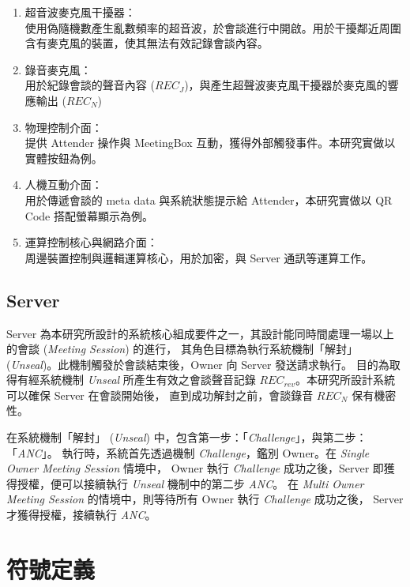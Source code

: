     \begin{enumerate}
        \item 超音波麥克風干擾器：\\
            使用偽隨機數產生亂數頻率的超音波，於會談進行中開啟。用於干擾鄰近周圍含有麥克風的裝置，使其無法有效記錄會談內容。

        \item 錄音麥克風：\\
            用於紀錄會談的聲音內容 ($REC_{J}$)，與產生超聲波麥克風干擾器於麥克風的響應輸出 ($REC_{N}$)

        \item 物理控制介面：\\
            提供 Attender 操作與 MeetingBox 互動，獲得外部觸發事件。本研究實做以實體按鈕為例。

        \item 人機互動介面：\\
            用於傳遞會談的 meta data 與系統狀態提示給 Attender，本研究實做以 QR Code 搭配螢幕顯示為例。

        \item 運算控制核心與網路介面：\\
            周邊裝置控制與邏輯運算核心，用於加密，與 Server 通訊等運算工作。
    \end{enumerate}


\subsection{Server}

    Server 為本研究所設計的系統核心組成要件之一，其設計能同時間處理一場以上的會談 ({\it Meeting Session}) 的進行，
其角色目標為執行系統機制「解封」 ({\it Unseal})。此機制觸發於會談結束後，Owner 向 Server 發送請求執行。
目的為取得有經系統機制 {\it Unseal} 所產生有效之會談聲音記錄 $REC_{rev}$。本研究所設計系統可以確保 Server 在會談開始後，
直到成功解封之前，會談錄音 $REC_{N}$ 保有機密性。

    在系統機制「解封」 ({\it Unseal}) 中，包含第一步：「{\it Challenge}」，與第二步：「{\it ANC}」。
執行時，系統首先透過機制 {\it Challenge}，鑑別 Owner。在 {\it Single Owner Meeting Session} 情境中，
Owner 執行 {\it Challenge} 成功之後，Server 即獲得授權，便可以接續執行 {\it Unseal} 機制中的第二步 {\it ANC}。
在 {\it Multi Owner Meeting Session} 的情境中，則等待所有 Owner 執行 {\it Challenge} 成功之後，
Server 才獲得授權，接續執行 {\it ANC}。


\section{符號定義}


